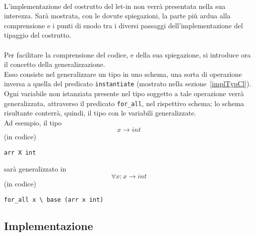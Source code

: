 \documentclass[12pt,a4paper,openright,twoside]{report}
\begin{document}
\paragraph{}
L'implementazione del costrutto del let-in non verrà presentata nella sua interezza. Sarà mostrata, con le dovute spiegazioni, la parte più ardua alla comprensione e i punti di snodo tra i diversi passaggi dell'implementazione del tipaggio del costrutto.

\paragraph{}
Per facilitare la comprensione del codice, e della sua spiegazione, si introduce ora il concetto della generalizzazione.\\
Esso consiste nel generalizzare un tipo in uno schema, una sorta di operazione inversa a quella del predicato \verb"instantiate" (mostrato nella sezione~\ref{implTypCl}). Ogni variabile non istanziata presente nel tipo soggetto a tale operazione verrà generalizzata, attraverso il predicato \verb"for_all", nel rispettivo schema; lo schema risultante conterrà, quindi, il tipo con le variabili generalizzate.\\
Ad esempio, il tipo
\begin{equation}
 x \rightarrow int \label{eq:x->int}
\end{equation}
(in codice)
\begin{center}
 \verb"arr X int"
\end{center}
sarà generalizzato in
\begin{equation}
 \forall x : x \rightarrow int \label{eq:fax->int}
\end{equation}
(in codice)
\begin{center}
 \verb"for_all x \ base (arr x int)"
\end{center}

\subsection{Implementazione}
\end{document}
